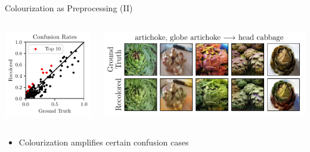 \documentclass{beamer}
\begin{document}
\begin{frame}{Colourization as Preprocessing (II)}
  \begin{columns}
    \begin{column}{0.4\textwidth}
      \includegraphics[width=\textwidth]{resources/confusion_rates.pdf}
    \end{column}
    \begin{column}{0.6\textwidth}
      \includegraphics[width=\textwidth]{resources/common_confusions.pdf}
    \end{column}
  \end{columns}

  \medskip

  \begin{itemize}
    \item Colourization amplifies certain confusion cases
  \end{itemize}
\end{frame}
\end{document}
